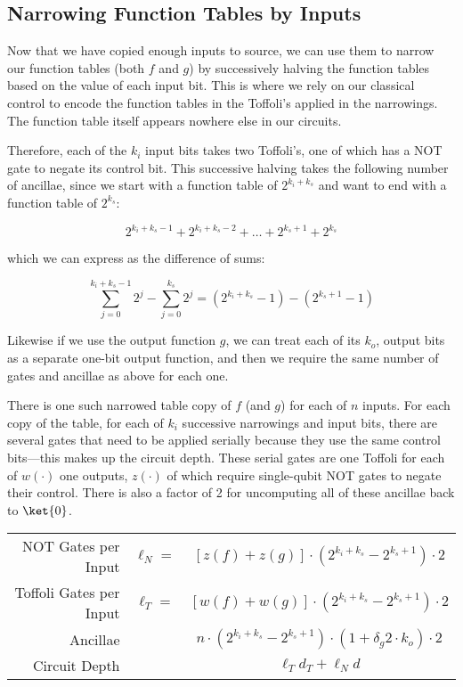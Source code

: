 \subsection{Narrowing Function Tables by Inputs}
\label{subsec:narrow}

Now that we have copied enough inputs to source, we can use them
to narrow our function tables (both $f$ and $g$) by successively
halving the function tables based on the value of each
input bit. This is where we rely on our classical control to encode
the function tables in the Toffoli's applied in the narrowings. The function
table itself appears nowhere else in our circuits.

Therefore, each of the $k_i$ input bits takes two Toffoli's,
one of which has a NOT gate to negate its control bit. This
successive halving takes the following number of ancillae, since we start
with a function table of $2^{k_i + k_s}$ and want to end with a function
table of $2^{k_s}$:

\begin{displaymath}
2^{k_i + k_s - 1} + 2^{k_i + k_s - 2} + \ldots + 2^{k_s + 1} + 2^{k_s}
\end{displaymath}

which we can express as the difference of sums:

\begin{displaymath}
\sum_{j=0}^{k_i + k_s - 1} 2^j - \sum_{j=0}^{k_s} 2^j = 
\left( 2^{k_i+k_s} - 1 \right) - \left( 2^{k_s+1} - 1 \right)
\end{displaymath}

Likewise if we use the output function $g$, we can treat each of its
$k_o$, output bits as a separate one-bit output function, and then we
require the same number of gates and ancillae as above for each one.

There is one such narrowed table copy of $f$ (and $g$) for each of $n$ inputs.
For each copy of the table, for each of $k_i$ successive narrowings and
input bits, there are several gates that need to be applied serially because
they use the same control bits---this makes up the circuit depth.
These serial gates are one Toffoli for each of $w(\cdot)$ one outputs,
$z(\cdot)$ of which require single-qubit NOT gates to negate their control.
There is also a factor
of 2 for uncomputing all of these ancillae back to $\ket{0}$.

\begin{table}
\begin{center}
\begin{tabular}{|r|cc|}
\hline
NOT Gates per Input & $\ell_N = $ & $[z(f)+z(g)] \cdot (2^{k_i+k_s} - 2^{k_s+1}) \cdot 2$ \\
Toffoli Gates per Input & $\ell_T = $ & $[w(f)+w(g)] \cdot (2^{k_i+k_s} - 2^{k_s+1}) \cdot 2$\\
Ancillae & & $n\cdot (2^{k_i+k_s} - 2^{k_s+1}) \cdot (1 + \delta_g2\cdot k_o) \cdot 2$\\
Circuit Depth & & $\ell_T d_T + \ell_N d$\\
\hline
\end{tabular}
\end{center}
\end{table}